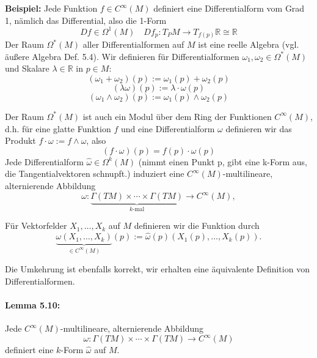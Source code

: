 \documentclass[fleqn, 12pt, letterpaper]{article}
\begin{document}
\textbf{Beispiel:}
Jede Funktion \( f \in C^\infty(M) \) definiert eine Differentialform vom Grad 1, nämlich das Differential, also die 1-Form
\[
{D}f \in \Omega^1(M) \quad Df_p:T_PM\rightarrow T_{f(p)}\mathbb{R}\cong\mathbb{R}
\]
Der Raum \( \Omega^*(M) \) aller Differentialformen auf \( M \) ist eine reelle Algebra (vgl. äußere Algebra Def. 5.4). Wir definieren für Differentialformen \( \omega_1, \omega_2 \in \Omega^*(M) \) und Skalare \( \lambda \in \mathbb{R} \) in \( p \in M \):
\[
(\omega_1 + \omega_2)(p) := \omega_1(p) + \omega_2(p)
\]
\[
(\lambda \omega)(p) := \lambda \cdot \omega(p)
\]
\[
(\omega_1 \wedge \omega_2)(p) := \omega_1(p) \wedge \omega_2(p)
\]

Der Raum \( \Omega^*(M) \) ist auch ein Modul über dem Ring der Funktionen \( C^\infty(M) \), d.h. für eine glatte Funktion \( f \) und eine Differentialform \( \omega \) definieren wir das Produkt \( f \cdot \omega := f \wedge \omega \), also
\[
(f \cdot \omega)(p) = f(p) \cdot \omega(p)
\]
Jede Differentialform \( \hat{\omega} \in \Omega^k(M) \) (nimmt einen Punkt p, gibt eine k-Form aus, die Tangentialvektoren schnupft.) induziert eine \( C^\infty(M) \)-multilineare, alternierende Abbildung
\[
\omega : \underbrace{\Gamma(TM) \times \cdots \times \Gamma(TM)}_{\text{$k$-mal}} \longrightarrow C^\infty(M),
\]

Für Vektorfelder \( X_1, \dots, X_k \) auf \( M \) definieren wir die Funktion durch
\[
\underbrace{\omega(X_1, \dots, X_k)}_{\in C^{\infty}(M)}(p) := \hat{\omega}(p)(X_1(p), \dots, X_k(p)).
\]

Die Umkehrung ist ebenfalls korrekt, wir erhalten eine äquivalente Definition von Differentialformen.

\paragraph{Lemma 5.10:} 
Jede \( C^\infty(M) \)-multilineare, alternierende Abbildung
\[
\omega : \Gamma(TM) \times \cdots \times \Gamma(TM) \longrightarrow C^\infty(M)
\]
definiert eine \( k \)-Form \( \hat{\omega} \) auf \( M \).
\end{document}
